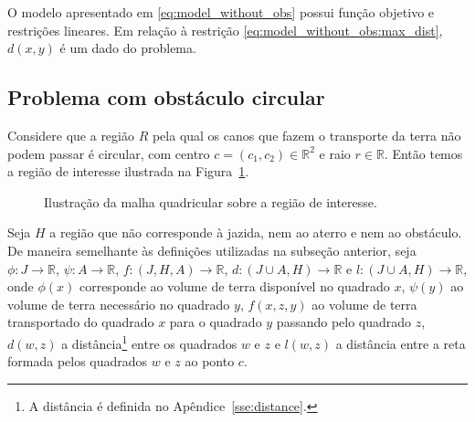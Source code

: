 O modelo apresentado em \eqref{eq:model_without_obs} possui função objetivo e
restrições lineares. Em relação à restrição
\eqref{eq:model_without_obs:max_dist}, $d(x, y)$ é um dado do problema.

\subsection{Problema com obstáculo circular}
Considere que a região $R$ pela qual os canos que fazem o transporte da terra
não podem passar é circular, com centro $c = (c_1, c_2) \in \mathbb{R}^2$ e raio
$r \in \mathbb{R}$. Então temos a região de interesse ilustrada na
Figura~\ref{fig:disc_J_A_R}.
\begin{figure}[!htb]
    \centering
    \caption{Ilustra\c{c}\~{a}o da malha quadricular sobre a regi\~{a}o de
    interesse.}
    \label{fig:disc_J_A_R}
\end{figure}

Seja $H$ a região que não corresponde \`{a} jazida, nem ao aterro e nem ao
obstáculo. De maneira semelhante \`{a}s definições utilizadas na subseção
anterior, seja $\phi: J \to \mathbb{R}$, $\psi: A \to \mathbb{R}$,
$f: (J, H, A) \to \mathbb{R}$, $d: (J \cup A, H) \to \mathbb{R}$ e $l:
(J \cup A, H) \to \mathbb{R}$, onde $\phi(x)$ corresponde ao volume de terra
disponível no quadrado $x$, $\psi(y)$ ao volume de terra necessário no quadrado
$y$, $f(x, z, y)$ ao volume de terra transportado do quadrado $x$ para o
quadrado $y$ passando pelo quadrado $z$, $d(w, z)$ a distância\footnote{A
distância é definida no Apêndice~\ref{sse:distance}.} entre os
quadrados $w$ e $z$ e $l(w, z)$ a distância entre a reta
formada pelos quadrados $w$ e $z$ ao ponto $c$.


